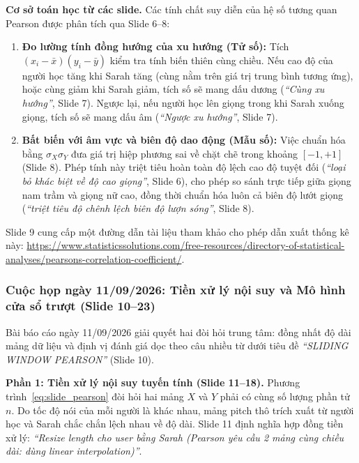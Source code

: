 \documentclass[11pt,a4paper]{article}
\begin{document}
\textbf{Cơ sở toán học từ các slide.} Các tính chất suy diễn của hệ số tương quan Pearson được phân tích qua Slide 6--8:
\begin{enumerate}
    \item \textbf{Đo lường tính đồng hướng của xu hướng (Tử số):} Tích $(x_i - \bar{x})(y_i - \bar{y})$ kiểm tra tính biến thiên cùng chiều. Nếu cao độ của người học tăng khi Sarah tăng (cùng nằm trên giá trị trung bình tương ứng), hoặc cùng giảm khi Sarah giảm, tích số sẽ mang dấu dương (\textit{``Cùng xu hướng''}, Slide 7). Ngược lại, nếu người học lên giọng trong khi Sarah xuống giọng, tích số sẽ mang dấu âm (\textit{``Ngược xu hướng''}, Slide 7).
    \item \textbf{Bất biến với âm vực và biên độ dao động (Mẫu số):} Việc chuẩn hóa bằng $\sigma_X \sigma_Y$ đưa giá trị hiệp phương sai về chặt chẽ trong khoảng $[-1, +1]$ (Slide 8). Phép tính này triệt tiêu hoàn toàn độ lệch cao độ tuyệt đối (\textit{``loại bỏ khác biệt về độ cao giọng''}, Slide 6), cho phép so sánh trực tiếp giữa giọng nam trầm và giọng nữ cao, đồng thời chuẩn hóa luôn cả biên độ lướt giọng (\textit{``triệt tiêu độ chênh lệch biên độ lượn sóng''}, Slide 8).
\end{enumerate}
Slide 9 cung cấp một đường dẫn tài liệu tham khảo cho phép dẫn xuất thống kê này: \url{https://www.statisticssolutions.com/free-resources/directory-of-statistical-analyses/pearsons-correlation-coefficient/}.

\subsubsection*{Cuộc họp ngày 11/09/2026: Tiền xử lý nội suy và Mô hình cửa sổ trượt (Slide 10--23)}

Bài báo cáo ngày 11/09/2026 giải quyết hai đòi hỏi trung tâm: đồng nhất độ dài mảng dữ liệu và định vị đánh giá dọc theo câu nhiều từ dưới tiêu đề \textit{``SLIDING WINDOW PEARSON''} (Slide 10).

\textbf{Phần 1: Tiền xử lý nội suy tuyến tính (Slide 11--18).} Phương trình~\eqref{eq:slide_pearson} đòi hỏi hai mảng $X$ và $Y$ phải có cùng số lượng phần tử $n$. Do tốc độ nói của mỗi người là khác nhau, mảng pitch thô trích xuất từ người học và Sarah chắc chắn lệch nhau về độ dài. Slide 11 định nghĩa hợp đồng tiền xử lý: \textit{``Resize length cho user bằng Sarah (Pearson yêu cầu 2 mảng cùng chiều dài: dùng linear interpolation)''}.
\end{document}

